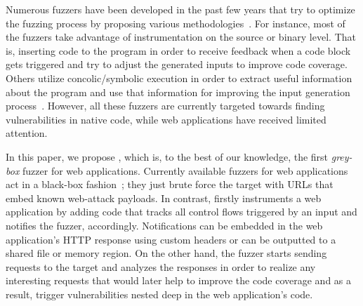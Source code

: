 Numerous fuzzers have been developed in the past few years that try to optimize the fuzzing process by proposing
various methodologies~\cite{aschermann2019redqueen,aschermann2019nautilus,stephens2016driller,rawat2017vuzzer,
osterlund2020parmesan,godefroid2005dart,godefroid2012sage}. For instance, most of the fuzzers take 
advantage of instrumentation on the source or binary level. That is, inserting code to the program in order to 
receive feedback when a code block gets triggered and try to adjust the generated inputs to improve code coverage. 
Others utilize concolic/symbolic execution in order to extract useful information about the program and use that 
information for improving the input generation process~\cite{stephens2016driller,godefroid2005dart,godefroid2012sage}. 
However, all these fuzzers are currently targeted towards finding 
vulnerabilities in native code, while web applications have received limited attention.

In this paper, we propose \pname{}, which is, to the best of our knowledge, the
first \emph{grey-box} fuzzer for web applications. Currently available fuzzers
for web applications act in a black-box fashion~\cite{doupe2010johnny}; they
just brute force the target with URLs that embed known web-attack
payloads. In contrast, \pname{} firstly instruments a web application by
adding code that tracks all control
flows triggered by an input and notifies the fuzzer, accordingly. Notifications can be embedded
in the web application's HTTP response using custom headers or can be outputted to a shared file 
or memory region.
On the other hand, the fuzzer starts sending requests to the target and
analyzes the responses in order to realize any interesting requests that would
later help to improve the code coverage and as a result, trigger  
vulnerabilities nested deep in the web application's code.

